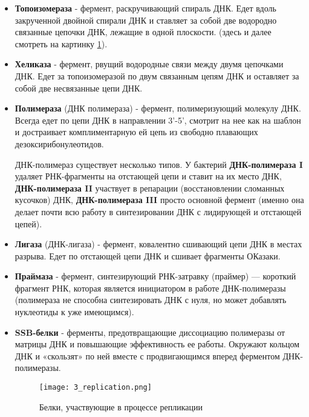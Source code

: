 \begin{itemize}

    \item \textbf{Топоизомераза} - фермент, раскручивающий спираль ДНК. Едет вдоль закрученной двойной спирали ДНК и ставляет за собой две водородно связанные цепочки ДНК, лежащие в одной плоскости. (здесь и далее смотреть на картинку \ref{fig:3_rep}).
    
    \item \textbf{Хеликаза} - фермент, рвущий водородные связи между двумя цепочками ДНК. Едет за топоизомеразой по двум связанным цепям ДНК и оставляет за собой две несвязанные цепи ДНК.
    
    \item \textbf{Полимераза} (ДНК полимераза) - фермент, полимеризующий молекулу ДНК. Всегда едет по цепи ДНК в направлении 3'-5', смотрит на нее как на шаблон и достраивает комплиментарную ей цепь из свободно плавающих дезоксирибонулеотидов. 
    
    ДНК-полимераз существует несколько типов. У бактерий \textbf{ДНК-полимераза I} удаляет РНК-фрагменты на отстающей цепи и ставит на их место ДНК, \textbf{ДНК-полимераза II} участвует в репарации (восстановлении сломанных кусочков) ДНК, \textbf{ДНК-полимераза III} просто основной фермент (именно она делает почти всю работу в синтезировании ДНК с лидирующей и отстающей цепей).
    
    \item \textbf{Лигаза} (ДНК-лигаза) - фермент, ковалентно сшивающий цепи ДНК в местах разрыва. Едет по отстающей цепи ДНК и сшивает фрагменты ОКазаки. 
    
    \item \textbf{Праймаза} - фермент, синтезирующий РНК-затравку (праймер) — короткий фрагмент РНК, которая является инициатором в работе ДНК-полимеразы (полимераза не способна синтезировать ДНК с нуля, но может добавлять нуклеотиды к уже имеющимся). 
    
    \item \textbf{SSB-белки} - ферменты, предотвращающие диссоциацию полимеразы от матрицы ДНК и повышающие эффективность ее работы. Окружают кольцом ДНК и «скользят» по ней вместе с продвигающимся вперед ферментом ДНК-полимеразы. 
    
    \begin{figure}[h!]
        \centering
        \texttt{[image: 3\_replication.png]}
        \caption{Белки, участвующие в процессе репликации}
        \label{fig:3_rep}
    \end{figure}
    
\end{itemize}

